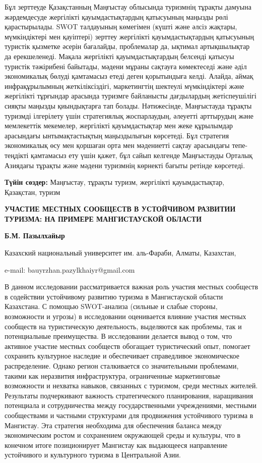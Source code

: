 Бұл зерттеуде Қазақстанның Маңғыстау облысында туризмнің тұрақты дамуына
жәрдемдесуде жергілікті қауымдастықтардың қатысуының маңызды рөлі
қарастырылады. SWOT талдауының көмегімен (күшті және әлсіз жақтары,
мүмкіндіктері мен қауіптері) зерттеу жергілікті қауымдастықтардың
қатысуының туристік қызметке әсерін бағалайды, проблемалар да, ықтимал
артықшылықтар да ерекшеленеді. Мақала жергілікті қауымдастықтардың
белсенді қатысуы туристік тәжірибені байытады, мәдени мұраны сақтауға
көмектеседі және әділ экономикалық бөлуді қамтамасыз етеді деген
қорытындыға келді. Алайда, аймақ инфрақұрылымның жеткіліксіздігі,
маркетингтің шектеулі мүмкіндіктері және жергілікті тұрғындар арасында
туризмге байланысты дағдылардың жетіспеушілігі сияқты маңызды
қиындықтарға тап болады. Нәтижесінде, Маңғыстауда тұрақты туризмді
ілгерілету үшін стратегиялық жоспарлаудың, әлеуетті арттырудың және
мемлекеттік мекемелер, жергілікті қауымдастықтар мен жеке құрылымдар
арасындағы ынтымақтастықтың маңыздылығын көрсетеді. Бұл стратегия
экономикалық өсу мен қоршаған орта мен мәдениетті сақтау арасындағы
тепе-теңдікті қамтамасыз ету үшін қажет, бұл сайып келгенде Маңғыстауды
Орталық Азиядағы тұрақты және мәдени туризмнің көрнекті бағыты ретінде
көрсетеді.

{\bfseries Түйін сөздер:} Маңғыстау, тұрақты туризм, жергілікті
қауымдастықтар, Қазақстан, туризм

{\bfseries УЧАСТИЕ МЕСТНЫХ СООБЩЕСТВ В УСТОЙЧИВОМ РАЗВИТИИ ТУРИЗМА: НА
ПРИМЕРЕ МАНГИСТАУСКОЙ ОБЛАСТИ}

{\bfseries Б.М. Пазылхайыр}

Казахский национальный университет им. аль-Фараби, Алматы, Казахстан,

e-mail: bauyrzhan.pazylkhaiyr@gmail.com

В данном исследовании рассматривается важная роль участия местных
сообществ в содействии устойчивому развитию туризма в Мангистауской
области Казахстана. С помощью SWOT-анализа (сильные и слабые стороны,
возможности и угрозы) в исследовании оценивается влияние участия местных
сообществ на туристическую деятельность, выделяются как проблемы, так и
потенциальные преимущества. В исследовании делается вывод о том, что
активное участие местных сообществ обогащает туристический опыт,
помогает сохранить культурное наследие и обеспечивает справедливое
экономическое распределение. Однако регион сталкивается со значительными
проблемами, такими как неразвития инфраструктура, ограниченные
маркетинговые возможности и нехватка навыков, связанных с туризмом,
среди местных жителей. Результаты подчеркивают важность стратегического
планирования, наращивания потенциала и сотрудничества между
государственными учреждениями, местными сообществами и частными
структурами для продвижения устойчивого туризма в Мангистау. Эта
стратегия необходима для обеспечения баланса между экономическим ростом
и сохранением окружающей среды и культуры, что в конечном итоге
позиционирует Мангистау как выдающееся направление устойчивого и
культурного туризма в Центральной Азии.

